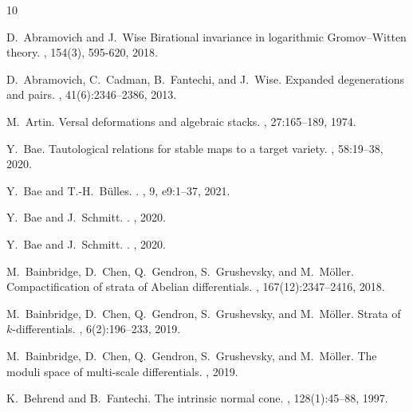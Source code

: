 \documentclass[a4paper,12pt]{article} %
\theoremstyle{definition}
\theoremstyle{plain}%
\begin{document}
\def\cprime{$'$}
\begin{thebibliography}{10}

D.~Abramovich and J.~Wise
\newblock Birational invariance in logarithmic Gromov–Witten theory. 
, 154(3), 595-620, 2018.

D.~Abramovich, C.~Cadman, B.~Fantechi, and J.~Wise.
\newblock Expanded degenerations and pairs.
, 41(6):2346--2386, 2013.


M.~Artin.
\newblock Versal deformations and algebraic stacks.
, 27:165--189, 1974.

Y.~Bae.
\newblock Tautological relations for stable maps to a target variety.
, 58:19--38, 2020.

Y.~Bae and T.-H.~B\"ulles.
.
, 9, e9:1--37, 2021. 

Y.~Bae and J.~Schmitt.
.
,
2020.

Y.~Bae and J.~Schmitt.
.
,
2020.

M.~Bainbridge, D.~Chen, Q.~Gendron, S.~Grushevsky, and M.~M\"{o}ller.
\newblock Compactification of strata of {A}belian differentials.
, 167(12):2347--2416, 2018.

M.~Bainbridge, D.~Chen, Q.~Gendron, S.~Grushevsky, and M.~M\"{o}ller.
\newblock Strata of {$k$}-differentials.
, 6(2):196--233, 2019.

M.~Bainbridge, D.~Chen, Q.~Gendron, S.~Grushevsky, and M.~M\"{o}ller.
\newblock The moduli space of multi-scale differentials.
, 2019.

K.~Behrend and B.~Fantechi.
\newblock The intrinsic normal cone.
, 128(1):45--88, 1997.


\end{thebibliography}
\end{document}
